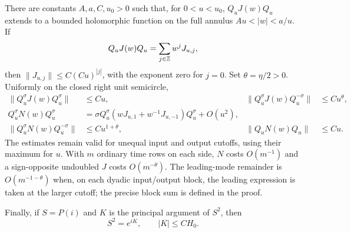 \begin{lemma}\label{lem:low-band}
There are constants $A,a,C,u_0>0$ such that, for $0<u<u_0$,
$Q_uJ(w)Q_u$ extends to a bounded holomorphic function on the full
annulus $Au<|w|<a/u$.  If
\begin{equation}\label{eq:angular-Laurent}
 Q_uJ(w)Q_u=\sum_{j\in\mathbb Z}w^j J_{u,j},
\end{equation}
then $\|J_{u,j}\|\le C(Cu)^{|j|}$, with the exponent zero for $j=0$.
Set $\theta=\eta/2>0$.  Uniformly on the closed right unit semicircle,
\begin{align}
 \|Q_u^\sigma J(w)Q_u^\sigma\|&\le Cu,
 &\|Q_u^\sigma J(w)Q_u^{-\sigma}\|&\le Cu^\theta,
 \label{eq:angular-J-bands}\\
 Q_u^\sigma N(w)Q_u^\sigma
 &=\sigma Q_u^\sigma(wJ_{u,1}+w^{-1}J_{u,-1})Q_u^\sigma+O(u^2),
 \label{eq:angular-N-leading}\\
 \|Q_u^\sigma N(w)Q_u^{-\sigma}\|&\le Cu^{1+\theta},
 &\|Q_uN(w)Q_u\|&\le Cu.
 \label{eq:angular-N-bands}
\end{align}
The estimates remain valid for unequal input and output cutoffs, using
their maximum for $u$.  With $m$ ordinary time rows on each side,
$N$ costs $O(m^{-1})$ and a sign-opposite undoubled $J$ costs
$O(m^{-\theta})$. The leading-mode remainder is $O(m^{-1-\theta})$
when, on each dyadic input/output block, the leading expression is
taken at the larger cutoff; the precise block sum is defined in the proof.

Finally, if $S=P(i)$ and $K$ is the principal argument of $S^2$, then
\begin{equation}\label{eq:angular-phase-bound}
 S^2=e^{iK},\qquad |K|\le C H_0.
\end{equation}
\end{lemma}

